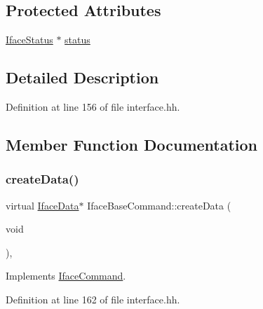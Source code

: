 \subsection*{Protected Attributes}
\begin{DoxyCompactItemize}
\item 
\mbox{\hyperlink{class_iface_status}{Iface\+Status}} $\ast$ \mbox{\hyperlink{class_iface_base_command_ab63ec3a4f15fd6abe779744ab66e454b}{status}}
\end{DoxyCompactItemize}


\subsection{Detailed Description}


Definition at line 156 of file interface.\+hh.



\subsection{Member Function Documentation}
\mbox{\label{class_iface_base_command_aa9084b1ec06e7bd05b88a89303fd42a4}} 
\subsubsection{\texorpdfstring{createData()}{createData()}}
{\footnotesize\ttfamily virtual \mbox{\hyperlink{class_iface_data}{Iface\+Data}}$\ast$ Iface\+Base\+Command\+::create\+Data (\begin{DoxyParamCaption}\item[{void}]{ }\end{DoxyParamCaption})\hspace{0.3cm}{\ttfamily [inline]}, {\ttfamily [virtual]}}



Implements \mbox{\hyperlink{class_iface_command_a908e484baf6e090b46ceb2ccaea8139d}{Iface\+Command}}.



Definition at line 162 of file interface.\+hh.

\mbox{\label{class_iface_base_command_add0c9e33b2e1a56b04caab6aaea343dd}} 
